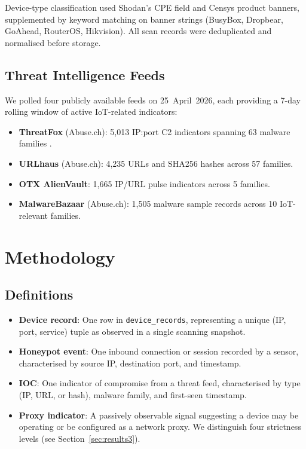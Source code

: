\documentclass[journal]{IEEEtran}
\begin{document}
\noindent Device-type classification used Shodan's CPE field and Censys product
banners, supplemented by keyword matching on banner strings (BusyBox, Dropbear,
GoAhead, RouterOS, Hikvision).
All scan records were deduplicated and normalised before storage.

\subsection{Threat Intelligence Feeds}

We polled four publicly available feeds on 25~April~2026, each providing a
7-day rolling window of active IoT-related indicators:

\begin{itemize}
  \item \textbf{ThreatFox} (Abuse.ch): 5{,}013 IP:port C2 indicators spanning
    63 malware families \cite{wagner2016misp}.
  \item \textbf{URLhaus} (Abuse.ch): 4{,}235 URLs and SHA256 hashes across
    57 families.
  \item \textbf{OTX AlienVault}: 1{,}665 IP/URL pulse indicators across
    5 families.
  \item \textbf{MalwareBazaar} (Abuse.ch): 1{,}505 malware sample records
    across 10 IoT-relevant families.
\end{itemize}

\section{Methodology}
\label{sec:methodology}

\subsection{Definitions}

\begin{itemize}
  \item \textbf{Device record}: One row in \texttt{device\_records},
    representing a unique (IP, port, service) tuple as observed in a single
    scanning snapshot.
  \item \textbf{Honeypot event}: One inbound connection or session recorded
    by a sensor, characterised by source IP, destination port, and timestamp.
  \item \textbf{IOC}: One indicator of compromise from a threat feed,
    characterised by type (IP, URL, or hash), malware family, and first-seen
    timestamp.
  \item \textbf{Proxy indicator}: A passively observable signal suggesting
    a device may be operating or be configured as a network proxy. We
    distinguish four strictness levels (see Section~\ref{sec:results3}).
\end{itemize}
\end{document}
